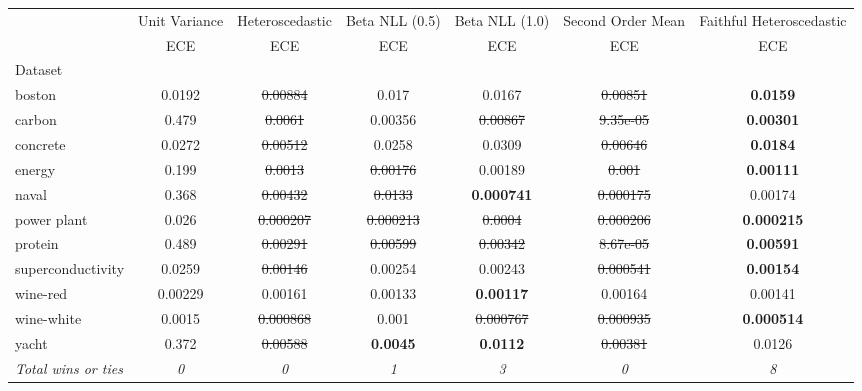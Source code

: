 \begin{tabular}{l|c|c|c|c|c|c}
\toprule
{} & {Unit Variance} & {Heteroscedastic} & {Beta NLL (0.5)} & {Beta NLL (1.0)} & {Second Order Mean} & {Faithful Heteroscedastic} \\
{} & {ECE} & {ECE} & {ECE} & {ECE} & {ECE} & {ECE} \\
{Dataset} & {} & {} & {} & {} & {} & {} \\
\midrule
boston & 0.0192 & \sout{0.00884} & 0.017 & 0.0167 & \sout{0.00851} & \textbf{0.0159} \\
carbon & 0.479 & \sout{0.0061} & 0.00356 & \sout{0.00867} & \sout{9.35e-05} & \textbf{0.00301} \\
concrete & 0.0272 & \sout{0.00512} & 0.0258 & 0.0309 & \sout{0.00646} & \textbf{0.0184} \\
energy & 0.199 & \sout{0.0013} & \sout{0.00176} & 0.00189 & \sout{0.001} & \textbf{0.00111} \\
naval & 0.368 & \sout{0.00432} & \sout{0.0133} & \textbf{0.000741} & \sout{0.000175} & 0.00174 \\
power plant & 0.026 & \sout{0.000207} & \sout{0.000213} & \sout{0.0004} & \sout{0.000206} & \textbf{0.000215} \\
protein & 0.489 & \sout{0.00291} & \sout{0.00599} & \sout{0.00342} & \sout{8.67e-05} & \textbf{0.00591} \\
superconductivity & 0.0259 & \sout{0.00146} & 0.00254 & 0.00243 & \sout{0.000541} & \textbf{0.00154} \\
wine-red & 0.00229 & 0.00161 & 0.00133 & \textbf{0.00117} & 0.00164 & 0.00141 \\
wine-white & 0.0015 & \sout{0.000868} & 0.001 & \sout{0.000767} & \sout{0.000935} & \textbf{0.000514} \\
yacht & 0.372 & \sout{0.00588} & \textbf{0.0045} & \textbf{0.0112} & \sout{0.00381} & 0.0126 \\
\textit{{Total wins or ties}} & \textit{0} & \textit{0} & \textit{1} & \textit{3} & \textit{0} & \textit{8} \\
\bottomrule
\end{tabular}
